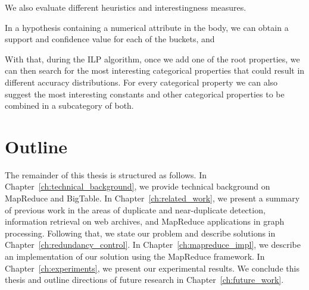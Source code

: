 We also evaluate different heuristics and interestingness measures.

In a hypothesis containing a numerical attribute in the body, we can obtain a support and confidence value for each of the buckets, and 

With that, during the ILP algorithm, once we add one of the root properties, we can then search for the most interesting categorical properties that could result in different accuracy distributions. For every categorical property we can also suggest the most interesting constants and other categorical properties to be combined in a subcategory of both.

\section{Outline}

The remainder of this thesis is structured as follows. In
Chapter~\ref{ch:technical_background}, we provide technical background on
MapReduce and BigTable. In Chapter~\ref{ch:related_work}, we present a
summary of previous work in the areas of duplicate and near-duplicate detection,
information retrieval on web archives, and MapReduce applications in graph
processing. Following that, we state our problem and describe solutions in
Chapter~\ref{ch:redundancy_control}. In Chapter~\ref{ch:mapreduce_impl}, we
describe an implementation of our solution using the MapReduce framework. In
Chapter~\ref{ch:experiments}, we present our experimental results. We conclude
this thesis and outline directions of future research in Chapter~\ref{ch:future_work}.